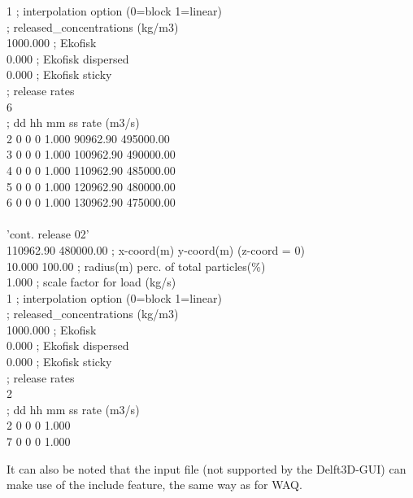 \documentclass[english]{deltares_manual}
\newcommand\tab[1][1cm]{\hspace*{#1}}
\begin{document}
\begin{tcolorbox}
{1                               \tab; interpolation option (0=block 1=linear)\\
; released\_concentrations (kg/m3)\\
1000.000      \tab  ; Ekofisk\\
0.000       \tab ; Ekofisk dispersed\\
0.000       \tab ; Ekofisk sticky\\
; release rates\\
6\\
; dd hh mm ss   \tab  rate (m3/s)\\
2  0  0  0     \tab    1.000  \tab     90962.90 \tab    495000.00  \\
3  0  0  0     \tab    1.000  \tab    100962.90 \tab    490000.00  \\
4  0  0  0     \tab    1.000 \tab     110962.90 \tab    485000.00  \\
5  0  0  0        \tab 1.000 \tab     120962.90 \tab    480000.00  \\
6  0  0  0      \tab   1.000 \tab     130962.90 \tab    475000.00 \\
\\
'cont. release 02' \\
110962.90   \tab   480000.00                 \tab; x-coord(m)      y-coord(m) (z-coord = 0)\\
10.000      \tab 100.00    \tab            ; radius(m)       perc. of total particles(\%)\\
1.000       \tab                        ; scale factor for load (kg/s)\\
1               \tab                ; interpolation option (0=block 1=linear)\\
; released\_concentrations (kg/m3)\\
1000.000      \tab  ; Ekofisk\\
0.000       \tab ; Ekofisk dispersed\\
0.000       \tab ; Ekofisk sticky\\
; release rates\\
2\\
; dd hh mm ss   \tab  rate (m3/s)\\
2  0  0  0        \tab 1.000     \\
7  0  0  0        \tab 1.000     \\
}
\end{tcolorbox}

It can also be noted that the input file (not supported by the Delft3D-GUI) can make use of the include feature, the same way as for WAQ.
\end{document}
